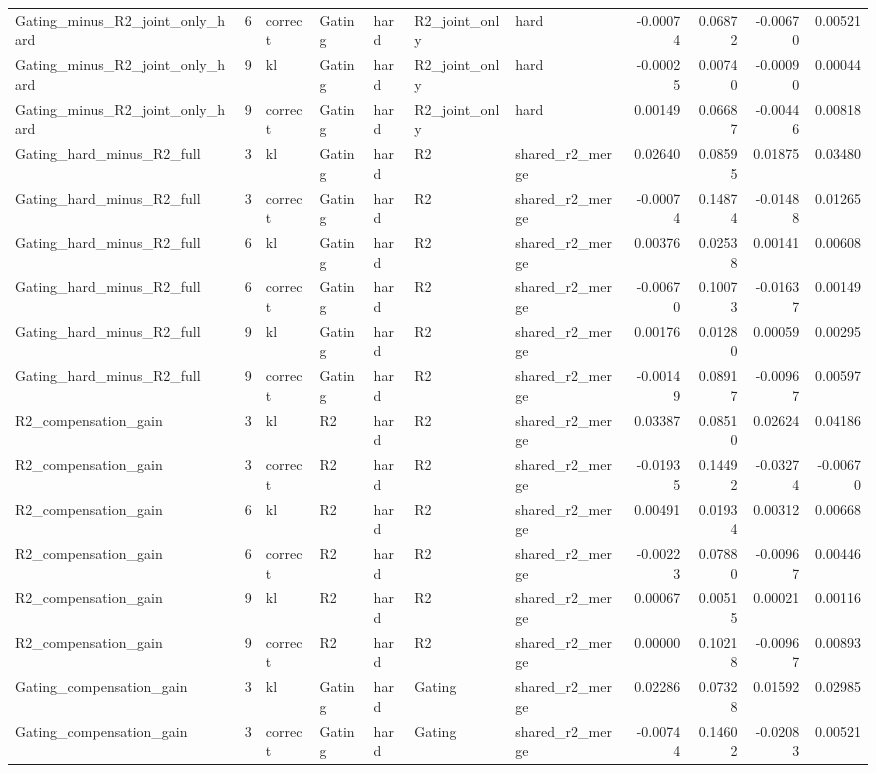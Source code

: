 \begin{tabular}{lrlllllrrrr}
Gating_minus_R2_joint_only_hard & 6 & correct & Gating & hard & R2_joint_only & hard & -0.00074 & 0.06872 & -0.00670 & 0.00521 \\
Gating_minus_R2_joint_only_hard & 9 & kl & Gating & hard & R2_joint_only & hard & -0.00025 & 0.00740 & -0.00090 & 0.00044 \\
Gating_minus_R2_joint_only_hard & 9 & correct & Gating & hard & R2_joint_only & hard & 0.00149 & 0.06687 & -0.00446 & 0.00818 \\
Gating_hard_minus_R2_full & 3 & kl & Gating & hard & R2 & shared_r2_merge & 0.02640 & 0.08595 & 0.01875 & 0.03480 \\
Gating_hard_minus_R2_full & 3 & correct & Gating & hard & R2 & shared_r2_merge & -0.00074 & 0.14874 & -0.01488 & 0.01265 \\
Gating_hard_minus_R2_full & 6 & kl & Gating & hard & R2 & shared_r2_merge & 0.00376 & 0.02538 & 0.00141 & 0.00608 \\
Gating_hard_minus_R2_full & 6 & correct & Gating & hard & R2 & shared_r2_merge & -0.00670 & 0.10073 & -0.01637 & 0.00149 \\
Gating_hard_minus_R2_full & 9 & kl & Gating & hard & R2 & shared_r2_merge & 0.00176 & 0.01280 & 0.00059 & 0.00295 \\
Gating_hard_minus_R2_full & 9 & correct & Gating & hard & R2 & shared_r2_merge & -0.00149 & 0.08917 & -0.00967 & 0.00597 \\
R2_compensation_gain & 3 & kl & R2 & hard & R2 & shared_r2_merge & 0.03387 & 0.08510 & 0.02624 & 0.04186 \\
R2_compensation_gain & 3 & correct & R2 & hard & R2 & shared_r2_merge & -0.01935 & 0.14492 & -0.03274 & -0.00670 \\
R2_compensation_gain & 6 & kl & R2 & hard & R2 & shared_r2_merge & 0.00491 & 0.01934 & 0.00312 & 0.00668 \\
R2_compensation_gain & 6 & correct & R2 & hard & R2 & shared_r2_merge & -0.00223 & 0.07880 & -0.00967 & 0.00446 \\
R2_compensation_gain & 9 & kl & R2 & hard & R2 & shared_r2_merge & 0.00067 & 0.00515 & 0.00021 & 0.00116 \\
R2_compensation_gain & 9 & correct & R2 & hard & R2 & shared_r2_merge & 0.00000 & 0.10218 & -0.00967 & 0.00893 \\
Gating_compensation_gain & 3 & kl & Gating & hard & Gating & shared_r2_merge & 0.02286 & 0.07328 & 0.01592 & 0.02985 \\
Gating_compensation_gain & 3 & correct & Gating & hard & Gating & shared_r2_merge & -0.00744 & 0.14602 & -0.02083 & 0.00521 \\

\end{tabular}
